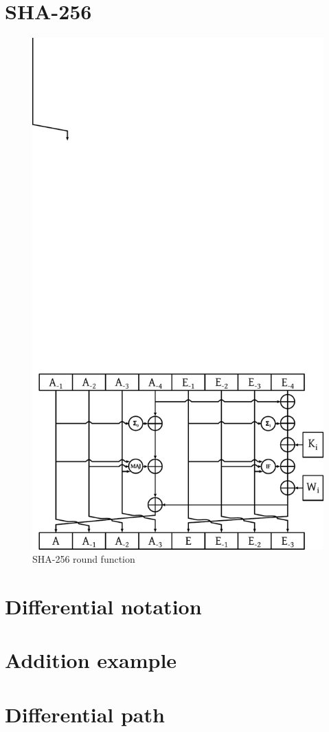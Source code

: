 \section{SHA-256}
\label{sec:dc-sha-256}


\begin{figure}[t]
  \begin{center}
    \includegraphics[width=\textwidth]{img/sha256.pdf}
    \caption{SHA-256 round function}
    \label{fig:sha256-round-function}
  \end{center}
\end{figure}

\section{Differential notation}
\label{sec:dc-notation}
%
\cite{char-2006}


\section{Addition example}
\section{Differential path}
